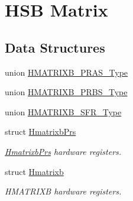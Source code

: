 \hypertarget{group___s_a_m_d21___h_m_a_t_r_i_x_b}{}\section{H\+SB Matrix}
\label{group___s_a_m_d21___h_m_a_t_r_i_x_b}
\subsection*{Data Structures}
\begin{DoxyCompactItemize}
\item 
union \mbox{\hyperlink{union_h_m_a_t_r_i_x_b___p_r_a_s___type}{H\+M\+A\+T\+R\+I\+X\+B\+\_\+\+P\+R\+A\+S\+\_\+\+Type}}
\item 
union \mbox{\hyperlink{union_h_m_a_t_r_i_x_b___p_r_b_s___type}{H\+M\+A\+T\+R\+I\+X\+B\+\_\+\+P\+R\+B\+S\+\_\+\+Type}}
\item 
union \mbox{\hyperlink{union_h_m_a_t_r_i_x_b___s_f_r___type}{H\+M\+A\+T\+R\+I\+X\+B\+\_\+\+S\+F\+R\+\_\+\+Type}}
\item 
struct \mbox{\hyperlink{struct_hmatrixb_prs}{Hmatrixb\+Prs}}
\begin{DoxyCompactList}\small\item\em \mbox{\hyperlink{struct_hmatrixb_prs}{Hmatrixb\+Prs}} hardware registers. \end{DoxyCompactList}\item 
struct \mbox{\hyperlink{struct_hmatrixb}{Hmatrixb}}
\begin{DoxyCompactList}\small\item\em H\+M\+A\+T\+R\+I\+XB hardware registers. \end{DoxyCompactList}\end{DoxyCompactItemize}

